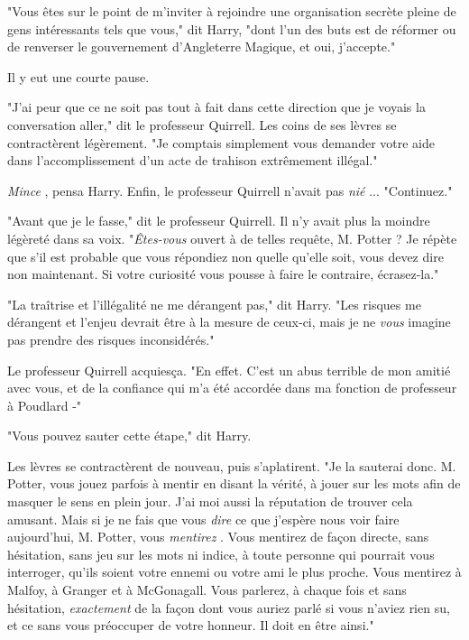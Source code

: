 "Vous êtes sur le point de m'inviter à rejoindre une organisation secrète pleine de gens intéressants tels que vous," dit Harry, "dont l'un des buts est de réformer ou de renverser le gouvernement d'Angleterre Magique, et oui, j'accepte."

Il y eut une courte pause.

"J'ai peur que ce ne soit pas tout à fait dans cette direction que je voyais la conversation aller," dit le professeur Quirrell. Les coins de ses lèvres se contractèrent légèrement. "Je comptais simplement vous demander votre aide dans l'accomplissement d'un acte de trahison extrêmement illégal."

\emph{Mince} , pensa Harry. Enfin, le professeur Quirrell n'avait pas \emph{nié} ... "Continuez."

"Avant que je le fasse," dit le professeur Quirrell. Il n'y avait plus la moindre légèreté dans sa voix. "\emph{Êtes-vous}  ouvert à de telles requête, M. Potter ? Je répète que s'il est probable que vous répondiez non quelle qu'elle soit, vous devez dire non maintenant. Si votre curiosité vous pousse à faire le contraire, écrasez-la."

"La traîtrise et l'illégalité ne me dérangent pas," dit Harry. "Les risques me dérangent et l'enjeu devrait être à la mesure de ceux-ci, mais je ne \emph{vous } imagine pas prendre des risques inconsidérés."

Le professeur Quirrell acquiesça. "En effet. C'est un abus terrible de mon amitié avec vous, et de la confiance qui m'a été accordée dans ma fonction de professeur à Poudlard -"

"Vous pouvez sauter cette étape," dit Harry.

Les lèvres se contractèrent de nouveau, puis s'aplatirent. "Je la sauterai donc. M. Potter, vous jouez parfois à mentir en disant la vérité, à jouer sur les mots afin de masquer le sens en plein jour. J'ai moi aussi la réputation de trouver cela amusant. Mais si je ne fais que vous \emph{dire}  ce que j'espère nous voir faire aujourd'hui, M. Potter, vous \emph{mentirez} . Vous mentirez de façon directe, sans hésitation, sans jeu sur les mots ni indice, à toute personne qui pourrait vous interroger, qu'ils soient votre ennemi ou votre ami le plus proche. Vous mentirez à Malfoy, à Granger et à McGonagall. Vous parlerez, à chaque fois et sans hésitation, \emph{exactement}  de la façon dont vous auriez parlé si vous n'aviez rien su, et ce sans vous préoccuper de votre honneur. Il doit en être ainsi."

